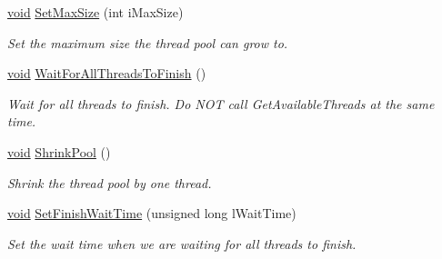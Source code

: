 \begin{DoxyCompactItemize}
\hyperlink{_cpclient_8h_a6464f7480a0fd0ee170cba12b2c0497f}{void} \hyperlink{class_c_x_plat_thread_pool_a62539ea3f7f7f37a994657a197c89447}{\-Set\-Max\-Size} (int i\-Max\-Size)
\begin{DoxyCompactList}\small\item\em \-Set the maximum size the thread pool can grow to. \end{DoxyCompactList}\item 
\hyperlink{_cpclient_8h_a6464f7480a0fd0ee170cba12b2c0497f}{void} \hyperlink{class_c_x_plat_thread_pool_a23928cd84c3136206f8b986263b55be3}{\-Wait\-For\-All\-Threads\-To\-Finish} ()
\begin{DoxyCompactList}\small\item\em \-Wait for all threads to finish. \-Do \-N\-O\-T call \-Get\-Available\-Threads at the same time. \end{DoxyCompactList}\item 
\hyperlink{_cpclient_8h_a6464f7480a0fd0ee170cba12b2c0497f}{void} \hyperlink{class_c_x_plat_thread_pool_a909ee6b050a921c8963c8f39ab98e1bd}{\-Shrink\-Pool} ()
\begin{DoxyCompactList}\small\item\em \-Shrink the thread pool by one thread. \end{DoxyCompactList}\item 
\hyperlink{_cpclient_8h_a6464f7480a0fd0ee170cba12b2c0497f}{void} \hyperlink{class_c_x_plat_thread_pool_a213b7c0d9ac2e31b8e61b7aef9193e03}{\-Set\-Finish\-Wait\-Time} (unsigned long l\-Wait\-Time)
\begin{DoxyCompactList}\small\item\em \-Set the wait time when we are waiting for all threads to finish. \end{DoxyCompactList}\end{DoxyCompactItemize}

